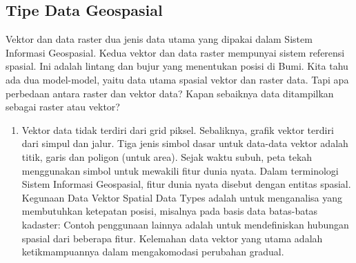 \subsection{Tipe Data Geospasial}
Vektor dan data raster dua jenis data utama yang dipakai dalam Sistem Informasi Geospasial. Kedua vektor dan data raster mempunyai sistem referensi spasial. Ini adalah lintang dan bujur yang menentukan posisi di Bumi. Kita tahu ada dua model-model, yaitu data utama spasial vektor dan raster data. Tapi apa perbedaan antara raster dan vektor data? Kapan sebaiknya data ditampilkan sebagai raster atau vektor?
\begin{enumerate}
\item Vektor data tidak terdiri dari grid piksel. Sebaliknya, grafik vektor terdiri dari simpul dan jalur. Tiga jenis simbol dasar untuk data-data vektor adalah titik, garis dan poligon (untuk area). Sejak waktu subuh, peta tekah menggunakan simbol untuk mewakili fitur dunia nyata. Dalam terminologi Sistem Informasi Geospasial, fitur dunia nyata disebut dengan entitas spasial. 
Kegunaan Data Vektor Spatial Data Types adalah untuk menganalisa yang membutuhkan ketepatan posisi, misalnya pada basis data batas-batas kadaster: Contoh penggunaan lainnya adalah untuk mendefiniskan hubungan spasial dari beberapa fitur. Kelemahan data vektor yang utama adalah ketikmampuannya dalam mengakomodasi perubahan gradual. 

\end{enumerate}


